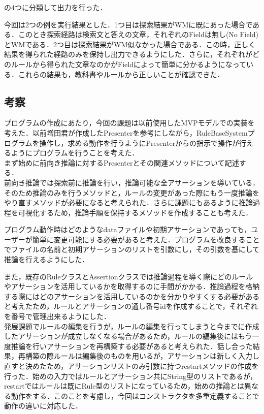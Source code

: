 \documentclass[12pt]{jarticle}
\begin{document}
の4つに分類して出力を行った．\par
今回は2つの例を実行結果とした．1つ目は探索結果がWMに既にあった場合である．このとき探索経路は検索文と答えの文章，それぞれのFieldは無し(No Field)とWMである．2つ目は探索結果がWM似なかった場合である．この時，正しく結果を得られた経路のみを保持し出力できるようにした．さらに，それぞれがどのルールから得られた文章なのかがFieldによって簡単に分かるようになっている．これらの結果も，教科書やルールから正しいことが確認できた．

\subsection{考察}
プログラムの作成にあたり，今回の課題は以前使用したMVPモデルでの実装を考えた．以前増田君が作成したPresenterを参考にしながら，RuleBaseSystemプログラムを操作し，求める動作を行うようにPresenterからの指示で操作が行えるようにプログラムを行うことを考えた．\\

まず始めに前向き推論に対するPresenterとその関連メソッドについて記述する．\\

前向き推論では探索前に推論を行い，推論可能な全アサーションを導いている．そのため推論のみを行うメソッドと，ルールの変更があった際にもう一度推論をやり直すメソッドが必要になると考えられた．さらに課題にもあるように推論過程を可視化するため，推論手順を保持するメソッドを作成することも考えた．\par
プログラム動作時はどのようなdataファイルや初期アサーションであっても，ユーザーが簡単に変更可能にする必要があると考えた．プログラムを改良することでファイルの名前と初期アサーションのリストを引数にし，その引数を基にして推論を行えるようにした．\par
また，既存のRuleクラスとAssertionクラスでは推論過程を導く際にどのルールやアサーションを活用しているかを取得するのに手間がかかる．推論過程を格納する際にはどのアサーションを活用しているのかを分かりやすくする必要があると考えたため，ルールとアサーションの通し番号idを作成することで，それぞれを番号で管理出来るようにした．\\

発展課題でルールの編集を行うが，ルールの編集を行ってしまうと今までに作成したアサーションが成立しなくなる場合があるため，ルールの編集後にはもう一度推論を行いアサーションを再構築する必要があると考えられた．話し合った結果，再構築の際ルールは編集後のものを用いるが，アサーションは新しく入力し直すと決めたため，アサーションリストのみ引数に持つrestartメソッドの作成を行った．始めの入力ではルールとアサーション共にString型のリストであるが，restartではルールは既にRule型のリストになっているため，始めの推論とは異なる動作をする．このことを考慮し，今回はコンストラクタを多重定義することで動作の違いに対応した．\\
\end{document}

